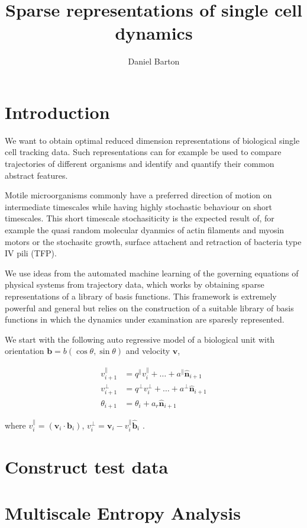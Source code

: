 \documentclass{article}
\title{Sparse representations of single cell dynamics}
\author{Daniel Barton}
\newcommand{\vct}[1]{\bm{#1}} %
\begin{document}
\maketitle


\section{Introduction}

We want to obtain optimal reduced dimension representations of biological single
cell tracking data. Such representations can for example be used to compare 
trajectories of different organisms and identify and 
quantify their common abstract features.

Motile microorganisms commonly have a preferred direction of motion on intermediate 
timescales while having highly stochastic behaviour on short timescales.
This short timescale stochasiticity is the expected result of, for example
the quasi random molecular dyanmics of actin filaments and myosin motors
or the stochasitc growth, surface attachent and retraction of bacteria type IV pili (TFP).

We  use ideas from the automated machine learning of the governing equations 
of physical systems from trajectory data, which works by obtaining 
sparse representations of a library of basis functions. This framework is
extremely powerful and general but relies on the construction of a suitable
library of basis functions in which the dynamics under examination are
sparesly represented.

We start with the following auto regressive model of a biological unit with 
orientation $\vct{b} = b(\cos{\theta}, \sin{\theta})$ and velocity $\vct{v}$,

\begin{equation}
\begin{split}
    v_{i+1}^\parallel & = q^\parallel v_i^\parallel + \ldots +  a^\parallel \vct{\hat{n}}_{i+1} \\
    v_{i+1}^\bot & = q^\bot v_i^\bot + \ldots + a^\bot \vct{\hat{n}}_{i+1} \\ 
    \theta_{i+1}  & = \theta_i + a_r \vct{\hat{n}}_{i+1}
\end{split}
\end{equation}

where $v_i^\parallel = (\vct{v}_i \cdot \vct{b}_i)$, 
$v_i^\bot = \vct{v}_i - v_i^\parallel\vct{\hat{b}}_i$ .



\section{Construct test data}

\section{Multiscale Entropy Analysis}



\medskip

\printbibliography

\end{document}
